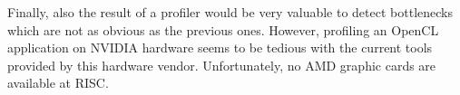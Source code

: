Finally, also the result of a profiler would be very valuable to detect bottlenecks which are not as obvious as the previous ones. However, profiling an OpenCL application on NVIDIA hardware seems to be tedious with the current tools provided by this hardware vendor. Unfortunately, no AMD graphic cards are available at RISC.
